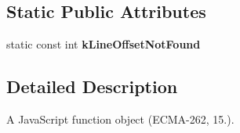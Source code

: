 \subsection*{Static Public Attributes}
\begin{DoxyCompactItemize}
\item 
\hypertarget{classv8_1_1Function_acf0af24f79908e405a6ac435277596d9}{static const int {\bfseries k\-Line\-Offset\-Not\-Found}}\label{classv8_1_1Function_acf0af24f79908e405a6ac435277596d9}

\end{DoxyCompactItemize}


\subsection{Detailed Description}
A Java\-Script function object (E\-C\-M\-A-\/262, 15.). 

